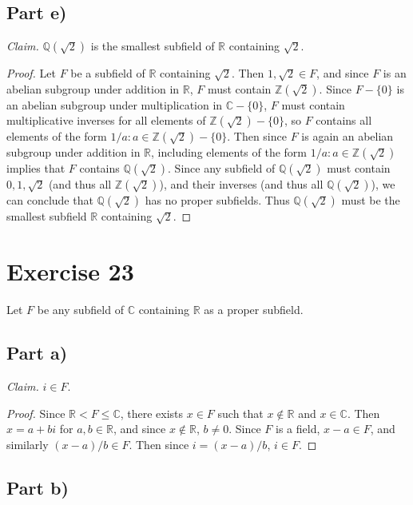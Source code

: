 \documentclass{abrice}
\newcommand{\Z}{\mathbb{Z}}
\newcommand{\R}{\mathbb{R}}
\newcommand{\Q}{\mathbb{Q}}
\renewcommand{\C}{\mathbb{C}}
\begin{document}
\subsection{Part e)}

\emph{Claim.} $\Q(\sqrt 2)$ is the smallest subfield of $\R$ containing $\sqrt
2$.

\begin{proof}
  Let $F$ be a subfield of $\R$ containing $\sqrt 2$. Then $1, \sqrt 2 \in F$,
  and since $F$ is an abelian subgroup under addition in $\R$, $F$ must contain
  $\Z(\sqrt 2)$. Since $F - \{0\}$ is an abelian subgroup under multiplication
  in $\C - \{0\}$, $F$ must contain multiplicative inverses for all elements of
  $\Z(\sqrt 2) - \{0\}$, so $F$ contains all elements of the form $1/a : a \in \Z(\sqrt
  2) - \{0\}$. Then since $F$ is again an abelian subgroup under addition in
  $\R$, including elements of the form $1/a : a \in \Z(\sqrt 2)$ implies that
  $F$ contains $\Q(\sqrt 2)$. Since any subfield of $\Q(\sqrt 2)$ must contain
  $0, 1, \sqrt 2$ (and thus all $\Z(\sqrt 2)$), and their inverses (and thus all
  $\Q(\sqrt 2)$), we can conclude that $\Q(\sqrt 2)$ has no proper subfields.
  Thus $\Q(\sqrt 2)$ must be the smallest subfield $\R$ containing $\sqrt 2$.
\end{proof}

\section{Exercise 23}

Let $F$ be any subfield of $\C$ containing $\R$ as a proper subfield.

\subsection{Part a)}

\emph{Claim.} $i \in F$.

\begin{proof}
  Since $\R < F \leq \C$, there exists $x \in F$ such that $x \notin \R$ and $x
  \in \C$. Then $x = a + bi$ for $a,b \in \R$, and since $x \notin \R$, $b \neq
  0$. Since $F$ is a field, $x - a \in F$, and similarly $(x - a) / b \in F$.
  Then since $i = (x - a) / b$, $i \in F$.
\end{proof}

\subsection{Part b)}
\end{document}
